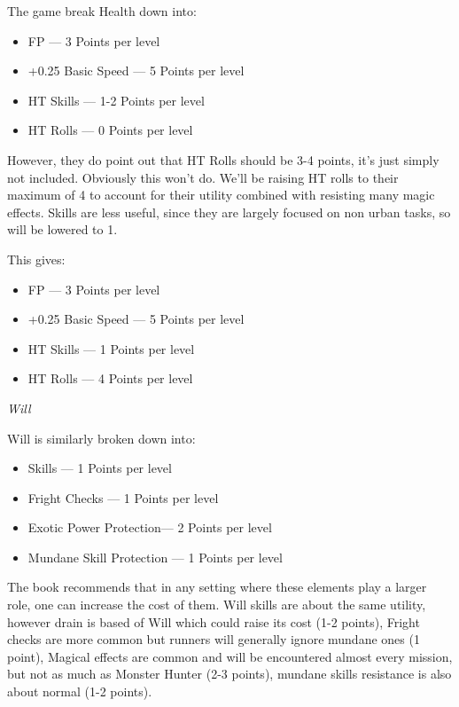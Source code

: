 \begin{multicols*}{2}
	The game break Health down into:
	\begin{itemize}
		\itemsep 0pt
		\item FP — 3 Points per level
		\item +0.25 Basic Speed — 5 Points per level
		\item HT Skills — 1-2 Points per level
		\item HT Rolls — 0 Points per level	
	\end{itemize}

	However, they do point out that HT Rolls should be 3-4 points, it's just simply not included. Obviously this won't do. We'll be raising HT rolls to their maximum of 4 to account for their utility combined with resisting many magic effects. Skills are less useful, since they are largely focused on non urban tasks, so will be lowered to 1.
	
	This gives:
	
	\begin{itemize}
		\itemsep 0pt
		\item FP — 3 Points per level
		\item +0.25 Basic Speed — 5 Points per level
		\item HT Skills — 1 Points per level
		\item HT Rolls — 4 Points per level	
	\end{itemize}
	
	
	\textit{Will}
	
	Will is similarly broken down into:
	
	\begin{itemize}
		\itemsep 0pt
		\item Skills — 1 Points per level
		\item Fright Checks — 1 Points per level
		\item Exotic Power Protection— 2 Points per level
		\item Mundane Skill Protection — 1 Points per level
	\end{itemize}

	The book recommends that in any setting where these elements play a larger role, one can increase the cost of them. Will skills are about the same utility, however drain is based of Will which could raise its cost (1-2 points), Fright checks are more common but runners will generally ignore mundane ones (1 point), Magical effects are common and will be encountered almost every mission, but not as much as Monster Hunter (2-3 points), mundane skills resistance is also about normal (1-2 points).
	

\end{multicols*}
